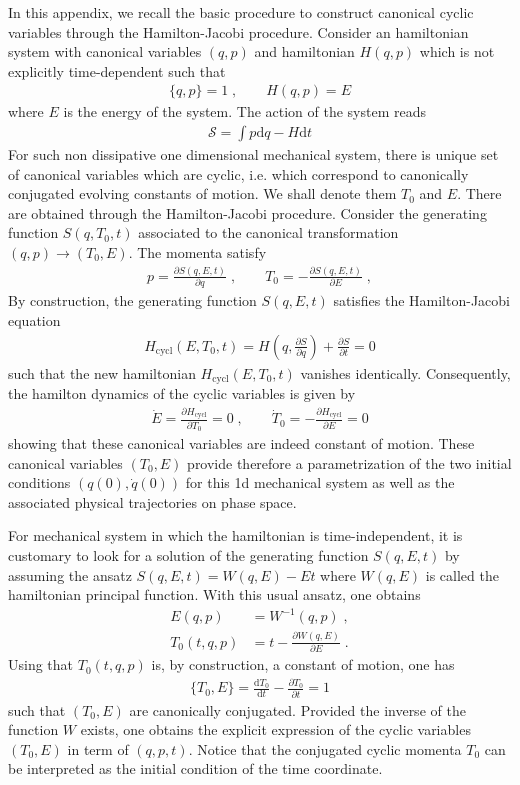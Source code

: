 \documentclass[onecolumn,notitlepage,superscriptaddress, nofootinbib,nobibnotes, aps,prd,10pt]{revtex4-1}%
\def\be{\begin{eqnarray}}
\def\ee{\end{eqnarray}}
\def\S{\mathcal{S}}
\def\dd{\mathrm{d}}
\begin{document}
In this appendix, we recall the basic procedure to construct canonical cyclic variables through the Hamilton-Jacobi procedure. 
Consider an hamiltonian system with canonical variables $(q,p)$ and hamiltonian $H(q,p)$ which is not explicitly time-dependent such that
\be
\{ q, p\} =1\;, \qquad H(q,p) =E
\ee 
where $E$ is the energy of the system. 
The action of the system reads
\be
\label{action0}
\S = \int p \dd q - H \dd t
\ee
For such non dissipative one dimensional mechanical system, there is unique set of canonical variables which are cyclic, i.e. which correspond to canonically conjugated evolving constants of motion. We shall denote them $T_0$ and $E$. There are obtained through the Hamilton-Jacobi procedure. Consider the generating function $S(q, T_0, t)$ associated to the canonical transformation $(q,p) \rightarrow (T_0,E)$. The momenta satisfy
\be
p = \frac{\partial S(q,E, t)}{\partial q} \;, \qquad T_0 = - \frac{\partial S(q, E, t)}{\partial E} \;, 
\ee
By construction, the generating function $S(q, E, t)$ satisfies the Hamilton-Jacobi equation
\be
H_{\text{cycl}}(E, T_0, t) %
= H \left( q, \frac{\partial S}{\partial q} \right) + \frac{\partial S}{\partial t} = 0
\ee 
such that the new hamiltonian $H_{\text{cycl}}(E,T_0,t)$ vanishes identically. Consequently, the hamilton dynamics of the cyclic variables is given by
\be
\dot{E} = \frac{\partial H_{\text{cycl}}}{\partial T_0} = 0 \;, \qquad \dot{T}_0 = - \frac{\partial H_{\text{cycl}}}{\partial E} =0
\ee 
showing that these canonical variables are indeed constant of motion. These canonical variables $(T_0, E)$ provide therefore a parametrization of the two initial conditions $\left( q(0), \dot{q}(0)\right)$ for this 1d mechanical system as well as the associated physical trajectories on phase space. 

For mechanical system in which the hamiltonian is time-independent, it is customary to look for a solution of the generating function $S(q, E, t)$ by assuming the ansatz $S(q,E, t) = W(q,E) - E t$ where $W(q,E)$ is called the hamiltonian principal function. With this usual ansatz, one obtains
\begin{align}
E(q, p) & = W^{-1} (q, p) \;,\\
\label{P}
T_0(t,q, p) & = t - \frac{\partial W(q, E)}{\partial E}  \;.
\end{align}
Using that $T_0(t,q,p)$ is, by construction, a constant of motion, one has
\be
 \{T_0, E \} = \frac{\dd T_0}{\dd t} - \frac{\partial T_0}{\partial t} = 1
 \ee
 such that $(T_0, E)$ are canonically conjugated.
Provided the inverse of the function $W$ exists, one obtains the explicit expression of the cyclic variables $(T_0, E)$ in term of $(q,p, t)$. Notice that the conjugated cyclic momenta $T_0$ can be interpreted as the initial condition of the time coordinate.
\end{document}
